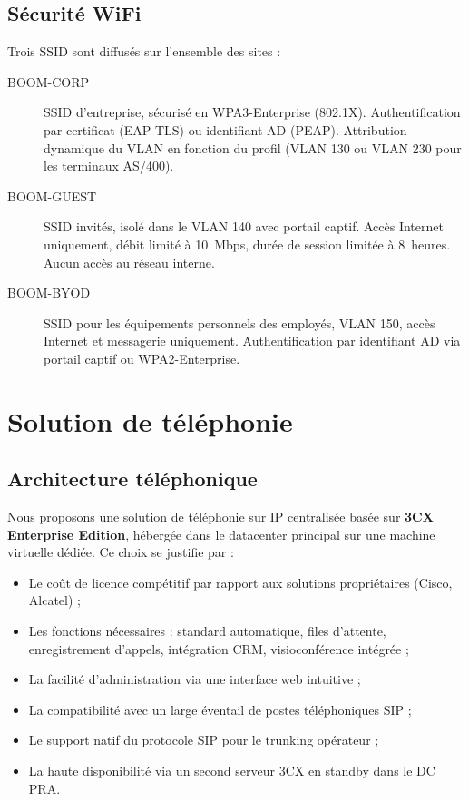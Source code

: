 \documentclass[12pt,a4paper]{report}
\begin{document}
\section{Sécurité WiFi}

Trois SSID sont diffusés sur l'ensemble des sites :

\begin{description}
\item[BOOM-CORP] SSID d'entreprise, sécurisé en WPA3-Enterprise (802.1X). Authentification par certificat (EAP-TLS) ou identifiant AD (PEAP). Attribution dynamique du VLAN en fonction du profil (VLAN 130 ou VLAN 230 pour les terminaux AS/400).
\item[BOOM-GUEST] SSID invités, isolé dans le VLAN 140 avec portail captif. Accès Internet uniquement, débit limité à 10~Mbps, durée de session limitée à 8~heures. Aucun accès au réseau interne.
\item[BOOM-BYOD] SSID pour les équipements personnels des employés, VLAN 150, accès Internet et messagerie uniquement. Authentification par identifiant AD via portail captif ou WPA2-Enterprise.
\end{description}


\chapter{Solution de téléphonie}

\section{Architecture téléphonique}

Nous proposons une solution de téléphonie sur IP centralisée basée sur \textbf{3CX Enterprise Edition}, hébergée dans le datacenter principal sur une machine virtuelle dédiée. Ce choix se justifie par :

\begin{itemize}
\item Le coût de licence compétitif par rapport aux solutions propriétaires (Cisco, Alcatel) ;
\item Les fonctions nécessaires : standard automatique, files d'attente, enregistrement d'appels, intégration CRM, visioconférence intégrée ;
\item La facilité d'administration via une interface web intuitive ;
\item La compatibilité avec un large éventail de postes téléphoniques SIP ;
\item Le support natif du protocole SIP pour le trunking opérateur ;
\item La haute disponibilité via un second serveur 3CX en standby dans le DC PRA.
\end{itemize}
\end{document}
